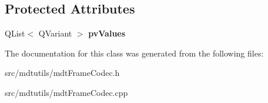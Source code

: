 \subsection*{Protected Attributes}
\begin{DoxyCompactItemize}
\item 
\hypertarget{classmdt_frame_codec_a3e7dc48b11dda3688f48eea2030f0953}{
QList$<$ QVariant $>$ {\bfseries pvValues}}
\label{classmdt_frame_codec_a3e7dc48b11dda3688f48eea2030f0953}

\end{DoxyCompactItemize}


The documentation for this class was generated from the following files:\begin{DoxyCompactItemize}
\item 
src/mdtutils/mdtFrameCodec.h\item 
src/mdtutils/mdtFrameCodec.cpp\end{DoxyCompactItemize}
